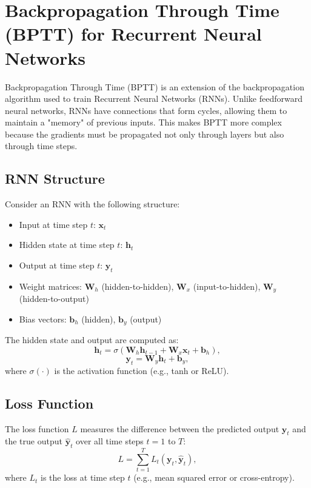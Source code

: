 \documentclass{article}
\begin{document}
\section*{Backpropagation Through Time (BPTT) for Recurrent Neural Networks}

Backpropagation Through Time (BPTT) is an extension of the backpropagation algorithm used to train Recurrent Neural Networks (RNNs). Unlike feedforward neural networks, RNNs have connections that form cycles, allowing them to maintain a "memory" of previous inputs. This makes BPTT more complex because the gradients must be propagated not only through layers but also through time steps.

\subsection*{RNN Structure}

Consider an RNN with the following structure:
\begin{itemize}
   \item Input at time step \( t \): \( \mathbf{x}_t \)
   \item Hidden state at time step \( t \): \( \mathbf{h}_t \)
   \item Output at time step \( t \): \( \mathbf{y}_t \)
   \item Weight matrices: \( \mathbf{W}_h \) (hidden-to-hidden), \( \mathbf{W}_x \) (input-to-hidden), \( \mathbf{W}_y \) (hidden-to-output)
   \item Bias vectors: \( \mathbf{b}_h \) (hidden), \( \mathbf{b}_y \) (output)
\end{itemize}

The hidden state and output are computed as:
\[
\mathbf{h}_t = \sigma(\mathbf{W}_h \mathbf{h}_{t-1} + \mathbf{W}_x \mathbf{x}_t + \mathbf{b}_h),
\]
\[
\mathbf{y}_t = \mathbf{W}_y \mathbf{h}_t + \mathbf{b}_y,
\]
where \( \sigma(\cdot) \) is the activation function (e.g., tanh or ReLU).

\subsection*{Loss Function}

The loss function \( L \) measures the difference between the predicted output \( \mathbf{y}_t \) and the true output \( \mathbf{\hat{y}}_t \) over all time steps \( t = 1 \) to \( T \):
\[
L = \sum_{t=1}^T L_t(\mathbf{y}_t, \mathbf{\hat{y}}_t),
\]
where \( L_t \) is the loss at time step \( t \) (e.g., mean squared error or cross-entropy).
\end{document}
